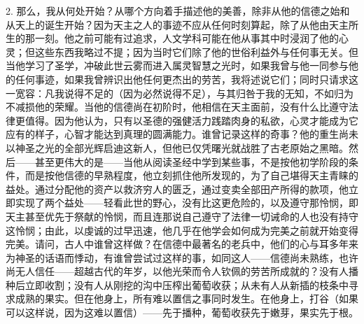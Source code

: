 2. 那么，我从何处开始？从哪个方向着手描述他的美善，除非从他的信德之始和从天上的诞生开始？因为天主之人的事迹不应从任何时刻算起，除了从他由天主所生的那一刻。他之前可能有过追求，人文学科可能在他从事其中时浸润了他的心灵；但这些东西我略过不提；因为当时它们除了他的世俗利益外与任何事无关。但当他学习了圣学，冲破此世云雾而进入属灵智慧之光时，如果我曾与他一同参与他的任何事迹，如果我曾辨识出他任何更杰出的劳苦，我将述说它们；同时只请求这一宽容：凡我说得不足的（因为必然说得不足），与其归咎于我的无知，不如归为不减损他的荣耀。当他的信德尚在初阶时，他相信在天主面前，没有什么比遵守法律更值得。因为他认为，只有以圣德的强健活力践踏肉身的私欲，心灵才能成为它应有的样子，心智才能达到真理的圆满能力。谁曾记录这样的奇事？他的重生尚未以神圣之光的全部光辉启迪这新人，但他已仅凭曙光就战胜了古老原始之黑暗。然后——甚至更伟大的是——当他从阅读圣经中学到某些事，不是按他初学阶段的条件，而是按他信德的早熟程度，他立刻抓住他所发现的，为了自己堪得天主青睐的益处。通过分配他的资产以救济穷人的匮乏，通过变卖全部田产所得的款项，他立即实现了两个益处——轻看此世的野心，没有比这更危险的，以及遵守那怜悯，即天主甚至优先于祭献的怜悯，而且连那说自己遵守了法律一切诫命的人也没有持守这怜悯；由此，以虔诚的过早迅速，他几乎在他学会如何成为完美之前就开始变得完美。请问，古人中谁曾这样做？在信德中最著名的老兵中，他们的心与耳多年来为神圣的话语而悸动，有谁曾尝试过这样的事，如同这人——信德尚未熟练，也许尚无人信任——超越古代的年岁，以他光荣而令人钦佩的劳苦所成就的？没有人播种后立即收割；没有人从刚挖的沟中压榨出葡萄收获；从未有人从新插的枝条中寻求成熟的果实。但在他身上，所有难以置信之事同时发生。在他身上，打谷（如果可以这样说，因为这难以置信）——先于播种，葡萄收获先于嫩芽，果实先于根。\par

